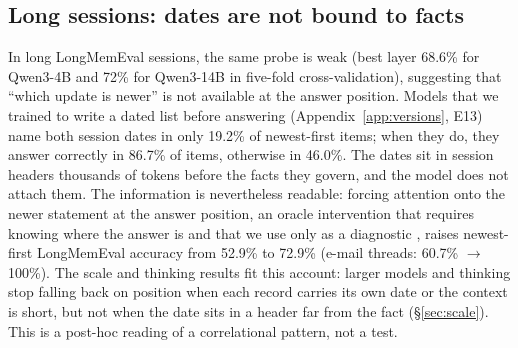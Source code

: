\documentclass[11pt]{article}
\begin{document}
\subsection{Long sessions: dates are not bound to facts}
In long LongMemEval sessions, the same probe is weak (best layer 68.6\% for Qwen3-4B and 72\% for Qwen3-14B in five-fold cross-validation), suggesting that ``which update is newer'' is not available at the answer position.
Models that we trained to write a dated list before answering (Appendix~\ref{app:versions}, E13) name both session dates in only 19.2\% of newest-first items; when they do, they answer correctly in 86.7\% of items, otherwise in 46.0\%.
The dates sit in session headers thousands of tokens before the facts they govern, and the model does not attach them.
The information is nevertheless readable: forcing attention onto the newer statement at the answer position, an oracle intervention that requires knowing where the answer is and that we use only as a diagnostic \citep[following][]{guo2026context}, raises newest-first LongMemEval accuracy from 52.9\% to 72.9\% (e-mail threads: 60.7\% $\rightarrow$ 100\%).
The scale and thinking results fit this account: larger models and thinking stop falling back on position when each record carries its own date or the context is short, but not when the date sits in a header far from the fact (\S\ref{sec:scale}). This is a post-hoc reading of a correlational pattern, not a test.
\end{document}
